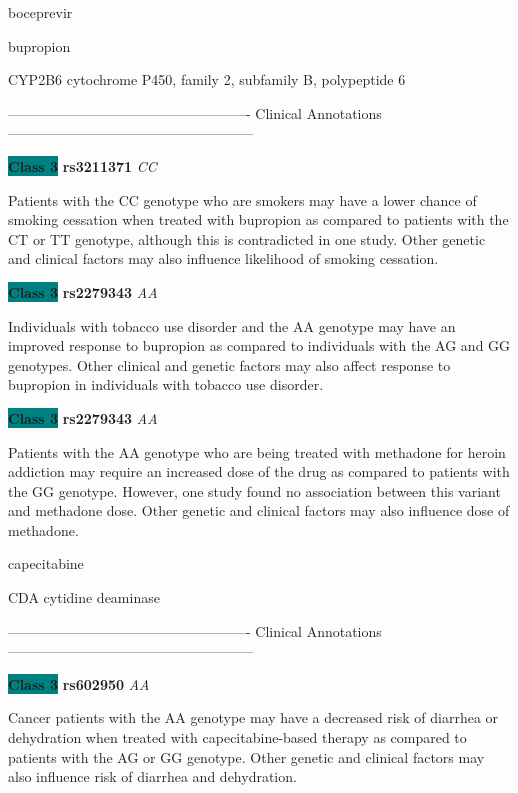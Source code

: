 \documentclass{resume} %
\begin{document}
\begin{rSection}{ boceprevir }
\end{rSection}\begin{rSection}{ bupropion }
\item[]

\begin{rSubsection}{ CYP2B6 }{ cytochrome P450, family 2, subfamily B, polypeptide 6 }{}{}
\item[]

\item[] ---------------------------------------------------- Clinical Annotations -----------------------------------------------------\newline
\item \textbf{\colorbox{teal} {Class 3}} \textbf{ rs3211371 } \textit{ CC }
\item[] Patients with the CC genotype who are smokers may have a lower chance of smoking cessation when treated with bupropion as compared to patients with the CT or TT genotype, although this is contradicted in one study. Other genetic and clinical factors may also influence likelihood of smoking cessation.\item \textbf{\colorbox{teal} {Class 3}} \textbf{ rs2279343 } \textit{ AA }
\item[] Individuals with tobacco use disorder and the AA genotype may have an improved response to bupropion as compared to individuals with the AG and GG genotypes. Other clinical and genetic factors may also affect response to bupropion in individuals with tobacco use disorder. \item \textbf{\colorbox{teal} {Class 3}} \textbf{ rs2279343 } \textit{ AA }
\item[] Patients with the AA genotype who are being treated with methadone for heroin addiction may require an increased dose of the drug as compared to patients with the GG genotype. However, one study found no association between this variant and methadone dose. Other genetic and clinical factors may also influence dose of methadone.
\end{rSubsection}

\end{rSection}\begin{rSection}{ capecitabine }
\item[]

\begin{rSubsection}{ CDA }{ cytidine deaminase }{}{}
\item[]

\item[] ---------------------------------------------------- Clinical Annotations -----------------------------------------------------\newline
\item \textbf{\colorbox{teal} {Class 3}} \textbf{ rs602950 } \textit{ AA }
\item[] Cancer patients with the AA genotype may have a decreased risk of diarrhea or dehydration when treated with capecitabine-based therapy as compared to patients with the AG or GG genotype. Other genetic and clinical factors may also influence risk of diarrhea and dehydration.
\end{rSubsection}


\end{rSection}
\end{document}
